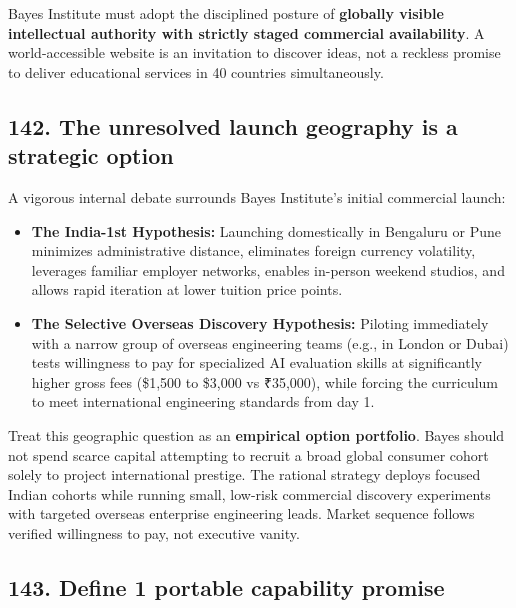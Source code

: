 Bayes Institute must adopt the disciplined posture of \textbf{globally visible intellectual authority with strictly staged commercial availability}. A world-accessible website is an invitation to discover ideas, not a reckless promise to deliver educational services in 40 countries simultaneously.

\subsection{142. The unresolved launch geography is a strategic option}

A vigorous internal debate surrounds Bayes Institute's initial commercial launch:
\begin{itemize}
    \item \textbf{The India-1st Hypothesis:} Launching domestically in Bengaluru or Pune minimizes administrative distance, eliminates foreign currency volatility, leverages familiar employer networks, enables in-person weekend studios, and allows rapid iteration at lower tuition price points.
    \item \textbf{The Selective Overseas Discovery Hypothesis:} Piloting immediately with a narrow group of overseas engineering teams (e.g., in London or Dubai) tests willingness to pay for specialized AI evaluation skills at significantly higher gross fees (\$1,500 to \$3,000 vs ₹35,000), while forcing the curriculum to meet international engineering standards from day 1.
\end{itemize}

Treat this geographic question as an \textbf{empirical option portfolio}. Bayes should not spend scarce capital attempting to recruit a broad global consumer cohort solely to project international prestige. The rational strategy deploys focused Indian cohorts while running small, low-risk commercial discovery experiments with targeted overseas enterprise engineering leads. Market sequence follows verified willingness to pay, not executive vanity.

\subsection{143. Define 1 portable capability promise}

